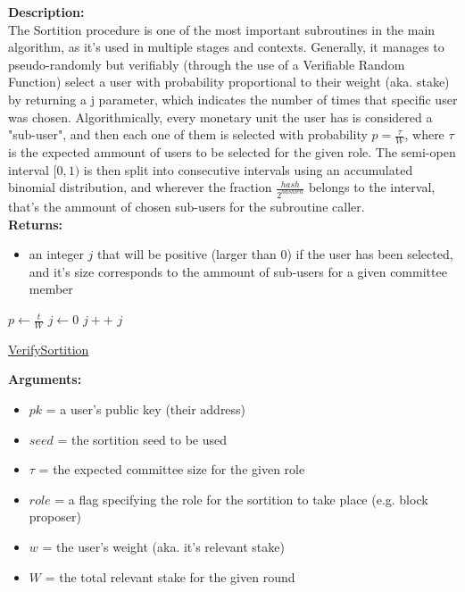 \documentclass[10pt,a4paper]{article}
\begin{document}
\noindent \textbf{Description:}\\
The Sortition procedure is one of the most important subroutines in the main algorithm, as it's used in multiple stages and contexts.
Generally, it manages to pseudo-randomly but verifiably (through the use of a Verifiable Random Function) select a user with probability proportional
to their weight (aka. stake) by returning a j parameter, which indicates the number of times that specific user was chosen.
Algorithmically, every monetary unit the user has is considered a "sub-user", and then each one of them is selected with probability $p = \frac{\tau}{W}$,
where $\tau$ is the expected ammount of users to be selected for the given role.
The semi-open interval $[0,1)$ is then split into consecutive intervals using an accumulated binomial distribution, and wherever the fraction $\frac{hash}{2^{hashlen}}$
belongs to the interval, that's the ammount of chosen sub-users for the subroutine caller.\\

\noindent \textbf{Returns:}
\begin{itemize}
    \item an integer $j$ that will be positive (larger than 0) if the user has been selected, and it's size corresponds to the ammount
    of sub-users for a given committee member
  \end{itemize}

\begin{algorithm}
    \begin{algorithmic}[H]
        \State $p \gets \frac{t}{W}$
        \State $j \gets 0$
        \While{$\frac{hash}{2^{hashlen}} \notin [\sum_{k=0}^jB(k;w,p), \sum_{k=0}^{j+1}B(k;w,p))$}
            \State $j++$
        \EndWhile
        \Return $j$
    \EndFunction
    \end{algorithmic}
    \caption{\underline{VerifySortition}}
\end{algorithm}

\noindent \textbf{Arguments:}
\begin{itemize}
    \item $pk$ = a user's public key (their address)
    \item $seed$ = the sortition seed to be used
    \item $\tau$ = the expected committee size for the given role
    \item $role$ = a flag specifying the role for the sortition to take place (e.g. block proposer)
    \item $w$ = the user's weight (aka. it's relevant stake)
    \item $W$ = the total relevant stake for the given round
  \end{itemize}
\end{document}
